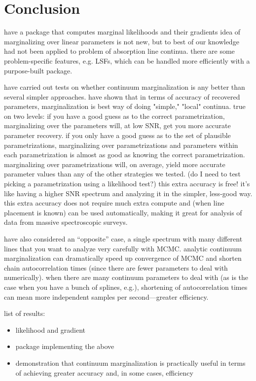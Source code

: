 \documentclass[manuscript]{aastex62}
\begin{document}
\section{Conclusion}
\label{sec:conclusion}
have a package that computes marginal likelihoods and their gradients
idea of marginalizing over linear parameters is not new, but to best of our knowledge had not been applied to problem of absorption line continua.
there are some problem-specific features, e.g. LSFs, which can be handled more efficiently with a purpose-built package.

have carried out tests on whether continuum marginalization is any better than several simpler approaches.
 have shown that in terms of accuracy of recovered parameters, marginalization is best way of doing "simple," "local" continua.
true on two levels: if you have a good guess as to the correct parametrization, marginalizing over the parameters will, at low SNR, get you more accurate parameter recovery.
if you only have a good guess as to the set of plausible parametrizations, marginalizing over parametrizations and parameters within each parametrization is almost as good as knowing the correct parametrization.
marginalizing over parametrizations will, on average, yield more accurate parameter values than any of the other strategies we tested. (do I need to test picking a parametrization using a likelihood test?)
this extra accuracy is free! it's like having a higher SNR spectrum and analyzing it in the simpler, less-good way.
this extra accuracy does not require much extra compute and (when line placement is known) can be used automatically, making it great for analysis of data from massive spectroscopic surveys.

have also considered an ``opposite'' case, a single spectrum with many different lines that you want to analyze very carefully with MCMC.
analytic continuum marginalization can dramatically speed up convergence of MCMC and shorten chain autocorrelation times (since there are fewer parameters to deal with numerically).
when there are many continuum parameters to deal with (as is the case when you have a bunch of splines, e.g.), shortening of autocorrelation times can mean more independent samples per second---greater efficiency.

list of results:
\begin{itemize}
  \item likelihood and gradient
  \item package implementing the above
  \item demonstration that continuum marginalization is practically useful in terms of achieving greater accuracy and, in some cases, efficiency
\end{itemize}

\acknowledgments



\end{document}
